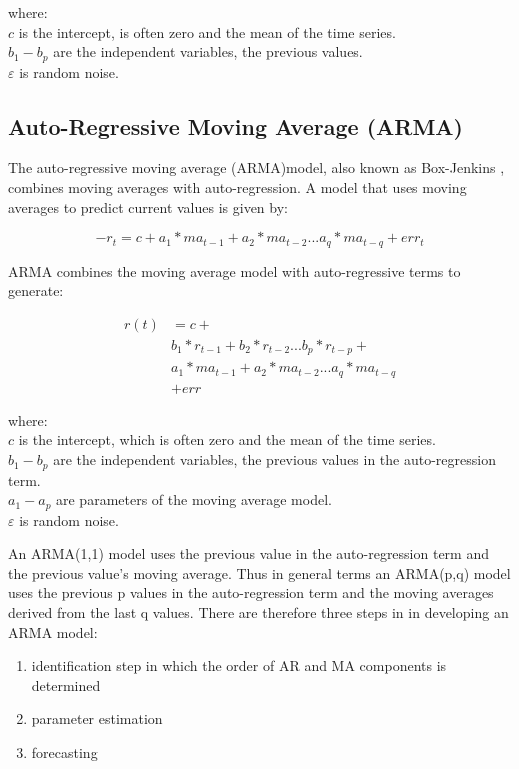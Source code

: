 where:\\
$ c $ is the intercept, is often zero and the mean of the time series. \\
$ b_{1}-b_{p} $ are the independent variables, the previous values.\\
$ \varepsilon $ is random noise. 

\subsection{Auto-Regressive Moving Average (ARMA)}
\label{sec:arma}
The auto-regressive moving average (ARMA)model, also known as Box-Jenkins \citep{box1970time}, combines moving averages with auto-regression. A model that uses moving averages to predict current values is given by:

\[ -r_{t}=c+a_{1}*ma_{t-1}+a_{2}*ma_{t-2}...a_{q}*ma_{t-q}+err_{t}\]

ARMA combines the moving average model with auto-regressive terms to generate:


\begin{align*}
	r(t) & =   c+ \\
    	 & b_{1}*r_{t-1}+b_{2}*r_{t-2}...b_{p}*r_{t-p}+ \\ 
      	 & a_{1}*ma_{t-1}+a_{2}*ma_{t-2}...a_{q}*ma_{t-q} \\
    	 & +err
\end{align*}

where:\\
$ c $ is the intercept, which is often zero and the mean of the time series. \\
$ b_{1}-b_{p} $ are the independent variables, the previous values in the auto-regression term.\\
$ a_{1}-a_{p} $ are parameters of the moving average model.\\
$ \varepsilon $ is random noise.

An ARMA(1,1) model uses the previous value in the auto-regression term and the previous value's moving average. Thus in general terms an ARMA(p,q) model uses the previous p values in the auto-regression term and the moving averages derived from the last q values. There are therefore three steps in in developing an ARMA model:
\begin{enumerate}
\item identification step in which the order of AR and MA components is determined
\item parameter estimation
\item forecasting
\end{enumerate}

